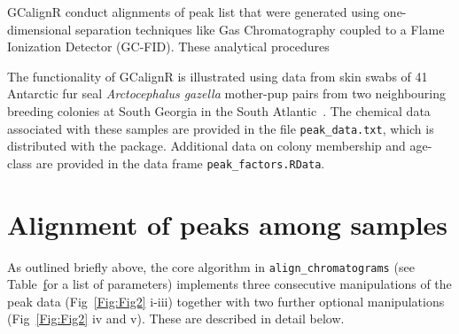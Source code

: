 \documentclass[10pt,letterpaper]{article}
\begin{document}
GCalignR conduct alignments of peak list that were generated using one-dimensional separation techniques like Gas Chromatography coupled to a Flame Ionization Detector (GC-FID). These analytical procedures 

The functionality of GCalignR is illustrated using  data from skin swabs of 41 Antarctic fur seal \textit{Arctocephalus gazella} mother-pup pairs from two neighbouring breeding colonies at South Georgia in the South Atlantic~\cite{Stoffel.2015}. The chemical data associated with these samples are provided in the file \texttt{peak\_data.txt}, which is distributed with the package. Additional data on colony membership and age-class are provided in the data frame \texttt{peak\_factors.RData}.

\section*{Alignment of  peaks among samples}
As outlined briefly above, the core algorithm in \texttt{align\_chromatograms} (see Table~\href{table:table1} for a list of parameters) implements three consecutive manipulations of the peak data (Fig~\ref{Fig:Fig2} i-iii) together with two further optional manipulations (Fig~\ref{Fig:Fig2} iv and v). These are described in detail below.
\end{document}
